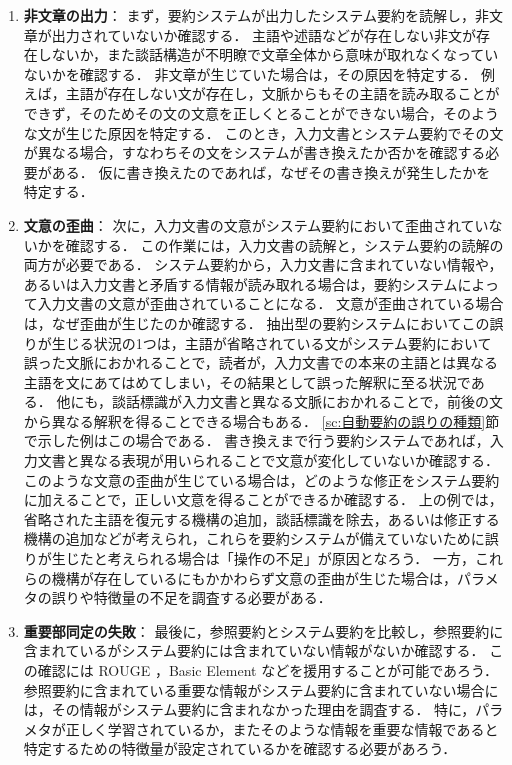 \begin{enumerate}
\item {\bf 非文章の出力}：
まず，要約システムが出力したシステム要約を読解し，非文章が出力されていないか確認する．
主語や述語などが存在しない非文が存在しないか，また談話構造が不明瞭で文章全体から意味が取れなくなっていないかを確認する．
非文章が生じていた場合は，その原因を特定する．
例えば，主語が存在しない文が存在し，文脈からもその主語を読み取ることができず，そのためその文の文意を正しくとることができない場合，そのような文が生じた原因を特定する．
このとき，入力文書とシステム要約でその文が異なる場合，すなわちその文をシステムが書き換えたか否かを確認する必要がある．
仮に書き換えたのであれば，なぜその書き換えが発生したかを特定する．
\item {\bf 文意の歪曲}：
次に，入力文書の文意がシステム要約において歪曲されていないかを確認する．
この作業には，入力文書の読解と，システム要約の読解の両方が必要である．
システム要約から，入力文書に含まれていない情報や，あるいは入力文書と矛盾する情報が読み取れる場合は，要約システムによって入力文書の文意が歪曲されていることになる．
文意が歪曲されている場合は，なぜ歪曲が生じたのか確認する．
抽出型の要約システムにおいてこの誤りが生じる状況の1つは，主語が省略されている文がシステム要約において誤った文脈におかれることで，読者が，入力文書での本来の主語とは異なる主語を文にあてはめてしまい，その結果として誤った解釈に至る状況である．
他にも，談話標識が入力文書と異なる文脈におかれることで，前後の文から異なる解釈を得ることできる場合もある．
\ref{sc:自動要約の誤りの種類}節で示した例はこの場合である．
書き換えまで行う要約システムであれば，入力文書と異なる表現が用いられることで文意が変化していないか確認する．
このような文意の歪曲が生じている場合は，どのような修正をシステム要約に加えることで，正しい文意を得ることができるか確認する．
上の例では，省略された主語を復元する機構の追加，談話標識を除去，あるいは修正する機構の追加などが考えられ，これらを要約システムが備えていないために誤りが生じたと考えられる場合は「操作の不足」が原因となろう．
一方，これらの機構が存在しているにもかかわらず文意の歪曲が生じた場合は，パラメタの誤りや特徴量の不足を調査する必要がある．
\item {\bf 重要部同定の失敗}：
最後に，参照要約とシステム要約を比較し，参照要約に含まれているがシステム要約には含まれていない情報がないか確認する．
この確認には ROUGE \cite{lin04}，Basic Element \cite{hovy06}などを援用することが可能であろう．
参照要約に含まれている重要な情報がシステム要約に含まれていない場合には，その情報がシステム要約に含まれなかった理由を調査する．
特に，パラメタが正しく学習されているか，またそのような情報を重要な情報であると特定するための特徴量が設定されているかを確認する必要があろう．
\end{enumerate}


